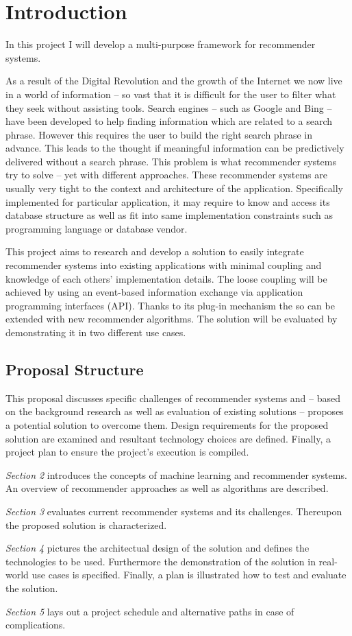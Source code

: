 \chapter{Introduction}

In this project I will develop a multi-purpose framework for recommender systems.

As a result of the Digital Revolution and the growth of the Internet we now live in a world of information -- so vast that it is difficult for the user to filter what they seek without assisting tools. Search engines -- such as Google and Bing -- have been developed to help finding information which are related to a search phrase. However this requires the user to build the right search phrase in advance. This leads to the thought if meaningful information can be predictively delivered without a search phrase. This problem is what recommender systems try to solve -- yet with different approaches. These recommender systems are usually very tight to the context and architecture of the application. Specifically implemented for particular application, it may require to know and access its database structure as well as fit into same implementation constraints such as programming language or database vendor.

This project aims to research and develop a solution to easily integrate recommender systems into existing applications with minimal coupling and knowledge of each others' implementation details. The loose coupling will be achieved by using an event-based information exchange via application programming interfaces (API). Thanks to its plug-in mechanism the so can be extended with new recommender algorithms. The solution will be evaluated by demonstrating it in two different use cases.

\section{Proposal Structure}

This proposal discusses specific challenges of recommender systems and -- based on the background research as well as evaluation of existing solutions -- proposes a potential solution to overcome them. Design requirements for the proposed solution are examined and resultant technology choices are defined. Finally, a project plan to ensure the project's execution is compiled.

\textit{Section 2} introduces the concepts of machine learning and recommender systems. An overview of recommender approaches as well as algorithms are described.

\textit{Section 3} evaluates current recommender systems and its challenges. Thereupon the proposed solution is characterized.

\textit{Section 4} pictures the architectual design of the solution and defines the technologies to be used. Furthermore the demonstration of the solution in real-world use cases is specified. Finally, a plan is illustrated how to test and evaluate the solution.

\textit{Section 5} lays out a project schedule and alternative paths in case of complications.